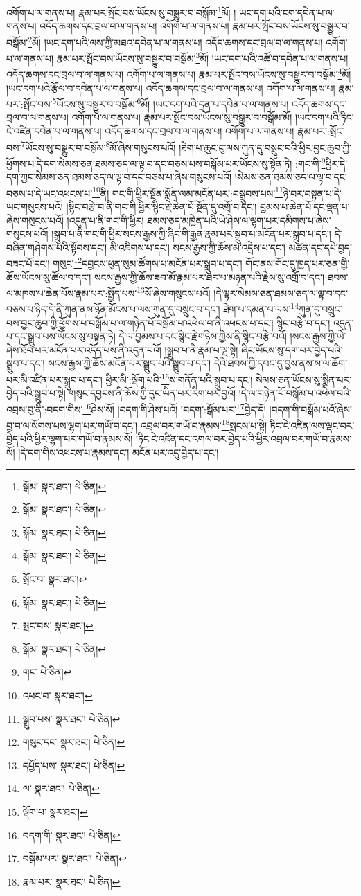 འགོག་པ་ལ་གནས་པ། རྣམ་པར་སྤོང་བས་ཡོངས་སུ་བསྒྱུར་བ་བསྒོམ་\footnote{སྒོམ་  སྣར་ཐང་།  པེ་ཅིན། }མོ། །
ཡང་དག་པའི་ངག་དབེན་པ་ལ་གནས་པ། འདོད་ཆགས་དང་བྲལ་བ་ལ་གནས་པ། འགོག་པ་ལ་གནས་པ། རྣམ་པར་སྤོང་བས་ཡོངས་སུ་བསྒྱུར་བ་བསྒོམ་\footnote{སྒོམ་  སྣར་ཐང་།  པེ་ཅིན། }མོ། །ཡང་དག་པའི་ལས་ཀྱི་མཐའ་དབེན་པ་ལ་གནས་པ། འདོད་ཆགས་དང་བྲལ་བ་ལ་གནས་པ། འགོག་པ་ལ་གནས་པ། རྣམ་པར་སྤོང་བས་ཡོངས་སུ་བསྒྱུར་བ་བསྒོམ་\footnote{སྒོམ་  སྣར་ཐང་།  པེ་ཅིན། }མོ། །ཡང་དག་པའི་འཚོ་བ་དབེན་པ་ལ་གནས་པ། འདོད་ཆགས་དང་བྲལ་བ་ལ་གནས་པ། འགོག་པ་ལ་གནས་པ། རྣམ་པར་སྤོང་བས་ཡོངས་སུ་བསྒྱུར་བ་བསྒོམ་\footnote{སྒོམ་  སྣར་ཐང་།  པེ་ཅིན། }མོ། །ཡང་དག་པའི་རྩོལ་བ་དབེན་པ་ལ་གནས་པ། འདོད་ཆགས་དང་བྲལ་བ་ལ་གནས་པ། འགོག་པ་ལ་གནས་པ། རྣམ་པར་:སྤོང་བས་\footnote{སྤོང་བ་  སྣར་ཐང་། }ཡོངས་སུ་བསྒྱུར་བ་བསྒོམ་\footnote{སྒོམ་  སྣར་ཐང་།  པེ་ཅིན། }མོ། །ཡང་དག་པའི་དྲན་པ་དབེན་པ་ལ་གནས་པ། འདོད་ཆགས་དང་བྲལ་བ་ལ་གནས་པ། འགོག་པ་ལ་གནས་པ། རྣམ་པར་སྤོང་བས་ཡོངས་སུ་བསྒྱུར་བ་བསྒོམ་མོ། །ཡང་དག་པའི་ཏིང་ངེ་འཛིན་དབེན་པ་ལ་གནས་པ། འདོད་ཆགས་དང་བྲལ་བ་ལ་གནས་པ། འགོག་པ་ལ་གནས་པ། རྣམ་པར་:སྤོང་བས་\footnote{སྤང་བས་  སྣར་ཐང་། }ཡོངས་སུ་བསྒྱུར་བ་བསྒོམ་\footnote{སྒོམ་  སྣར་ཐང་།  པེ་ཅིན། }མོ་ཞེས་གསུངས་པའོ། །ཐེག་པ་ཆུང་ངུ་ལས་ཀུན་དུ་བསྲུང་བའི་ཕྱིར་བྱང་ཆུབ་ཀྱི་ཕྱོགས་པ་དེ་དག་སེམས་ཅན་ཐམས་ཅད་ལ་ལྟ་བ་དང་བཅས་པས་བསྒོམ་པར་ཡོངས་སུ་སྟོན་ཏེ། :གང་གི་\footnote{གང་  པེ་ཅིན། }ཕྱིར་དེ་དག་ཀྱང་སེམས་ཅན་ཐམས་ཅད་ལ་ལྟ་བ་དང་བཅས་པ་ཞེས་གསུངས་པའོ། །སེམས་ཅན་ཐམས་ཅད་ལ་ལྟ་བ་དང་བཅས་པ་དེ་ཡང་འཕངས་པ་\footnote{འཕང་བ་  སྣར་ཐང་། }ནི། གང་གི་ཕྱིར་སྔོན་སྨོན་ལམ་མངོན་པར་:བསྒྲུབས་པས་\footnote{སྒྲུབ་པས་  སྣར་ཐང་།  པེ་ཅིན། }ཉེ་བར་བསྟན་པ་དེ་ཡང་གསུངས་པའོ། །སྙིང་བརྩེ་བ་ནི་གང་གི་ཕྱིར་སྙིང་རྗེ་ཆེན་པོ་སྔོན་དུ་འགྲོ་བ་དང་། བྱམས་པ་ཆེན་པོ་དང་ལྡན་པ་ཞེས་གསུངས་པའོ། །འདུན་པ་ནི་གང་གི་ཕྱིར། ཐམས་ཅད་མཁྱེན་པའི་ཡེ་ཤེས་ལ་ལྷག་པར་དམིགས་པ་ཞེས་གསུངས་པའོ། །སྒྲུབ་པ་ནི་གང་གི་ཕྱིར་སངས་རྒྱས་ཀྱི་ཞིང་གི་རྒྱན་རྣམ་པར་སྒྲུབ་པ་མངོན་པར་སྒྲུབ་པ་དང་། དེ་བཞིན་གཤེགས་པའི་སྟོབས་དང་། མི་འཇིགས་པ་དང་། སངས་རྒྱས་ཀྱི་ཆོས་མ་འདྲེས་པ་དང་། མཚན་དང་དཔེ་བྱད་བཟང་པོ་དང་། གསུང་\footnote{གསུང་དང་  སྣར་ཐང་།  པེ་ཅིན། }དབྱངས་ཕུན་སུམ་ཚོགས་པ་མངོན་པར་སྒྲུབ་པ་དང་། གོང་ནས་གོང་དུ་ཁྱད་པར་ཅན་གྱི་ཆོས་ཡོངས་སུ་ཚོལ་བ་དང་། སངས་རྒྱས་ཀྱི་ཆོས་ཟབ་མོ་རྣམ་པར་ཐར་པ་མཉན་པའི་རྗེས་སུ་འགྲོ་བ་དང་། ཐབས་ལ་མཁས་པ་ཆེན་པོས་རྣམ་པར་:སྤྱོད་པས་\footnote{དཔྱོད་པས་  སྣར་ཐང་།  པེ་ཅིན། }སོ་ཞེས་གསུངས་པའོ། །དེ་ལྟར་སེམས་ཅན་ཐམས་ཅད་ལ་ལྟ་བ་དང་བཅས་པ་ཉིད་དེ་ནི་ཀུན་ནས་ཉོན་མོངས་པ་ལས་ཀུན་དུ་བསྲུང་བ་དང་། ཐེག་པ་དམན་པ་ལས་\footnote{ལ་  སྣར་ཐང་།  པེ་ཅིན། }ཀུན་དུ་བསྲུང་བས་བྱང་ཆུབ་ཀྱི་ཕྱོགས་པ་བསྒོམ་པ་ལ་གཉེན་པོ་བསྒོམ་པ་འཕེལ་བ་ནི་འཕངས་པ་དང་། སྙིང་བརྩེ་བ་དང་། འདུན་པ་དང་སྒྲུབ་པས་ཡོངས་སུ་བསྟན་ཏེ། དེ་ལ་བྱམས་པ་དང་སྙིང་རྗེ་གཉིས་ཀྱིས་ནི་སྙིང་བརྩེ་བའོ། །སངས་རྒྱས་ཀྱི་ཡེ་ཤེས་ཐོབ་པར་མངོན་པར་འདོད་པས་ནི་འདུན་པའོ། །སྒྲུབ་པ་ནི་རྣམ་པ་ལྔ་སྟེ། ཞིང་ཡོངས་སུ་དག་པར་བྱེད་པའི་སྒྲུབ་པ་དང་། སངས་རྒྱས་ཀྱི་ཆོས་མངོན་པར་སྒྲུབ་པའི་སྒྲུབ་པ་དང་། དེའི་ཐབས་ཀྱི་དབང་དུ་བྱས་ནས་ས་ལ་ཆོག་པར་མི་འཛིན་པར་སྒྲུབ་པ་དང་། ཕྱིར་མི་:ལྡོག་པའི་\footnote{ལྡོག་པ་  སྣར་ཐང་། }ས་གནོན་པའི་སྒྲུབ་པ་དང་། སེམས་ཅན་ཡོངས་སུ་སྨིན་པར་བྱེད་པའི་སྒྲུབ་པ་སྟེ། གསུང་དབྱངས་ནི་ཆོས་ཀྱི་དུང་ཡིན་པར་རིག་པར་བྱའོ། །དེ་ལ་གཉེན་པོ་བསྒོམ་པ་འཕེལ་བའི་འབྲས་བུ་ནི་:བདག་གིས་\footnote{བདག་གི་  སྣར་ཐང་།  པེ་ཅིན། }ཤེས་སོ། །བདག་གི་ཤེས་པའོ། །བདག་:སྒོམ་པར་\footnote{བསྒོམ་པར་  སྣར་ཐང་།  པེ་ཅིན། }བྱེད་དོ། །བདག་གི་བསྒོམ་པའོ་ཞེས་བྱ་བ་ལ་སོགས་པས་ལྷག་པར་གཡོ་བ་དང་། འབྲལ་བར་གཡོ་བ་རྣམས་\footnote{རྣམ་པར་  སྣར་ཐང་།  པེ་ཅིན། }སྤངས་པ་སྟེ། ཏིང་ངེ་འཛིན་ལས་ལྡང་བར་བྱེད་པའི་ཕྱིར་ལྷག་པར་གཡོ་བ་རྣམས་སོ། །ཏིང་ངེ་འཛིན་དང་འགལ་བར་བྱེད་པའི་ཕྱིར་འབྲལ་བར་གཡོ་བ་རྣམས་སོ། །དེ་དག་གིས་འཕངས་པ་རྣམས་དང་། མངོན་པར་འདུ་བྱེད་པ་དང་། 